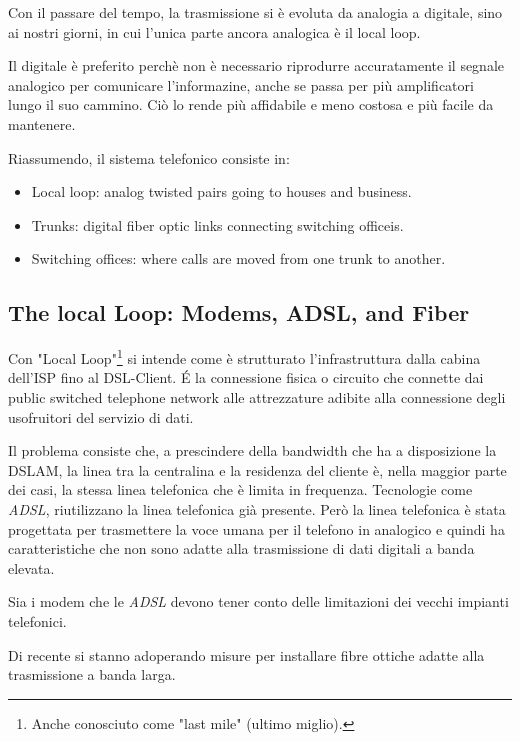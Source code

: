 \documentclass[../ComputerNetworks.tex]{subfiles}
\begin{document}
Con il passare del tempo, la trasmissione si è evoluta da analogia a digitale, sino ai nostri giorni, in cui l'unica parte ancora analogica è il local loop.

Il digitale è preferito perchè non è necessario riprodurre accuratamente il segnale analogico per comunicare l'informazine, anche se passa per più amplificatori lungo il suo cammino.
Ciò lo rende più affidabile e meno costosa e più facile da mantenere.

Riassumendo, il sistema telefonico consiste in:
\begin{itemize}
    \item Local loop: analog twisted pairs going to houses and business.
    \item Trunks: digital fiber optic links connecting switching officeis.
    \item Switching offices: where calls are moved from one trunk to another.
\end{itemize}


\subsection{The local Loop: Modems, ADSL, and Fiber}

Con "Local Loop"\footnote{Anche conosciuto come "last mile" (ultimo miglio).} si intende come è strutturato l'infrastruttura dalla cabina dell'ISP fino al DSL-Client.
\'E la connessione fisica o circuito che connette dai public switched telephone network alle attrezzature adibite alla connessione degli usofruitori del servizio di dati.

Il problema consiste che, a prescindere della bandwidth che ha a disposizione la DSLAM, la linea tra la centralina e la residenza del cliente è, nella maggior parte dei casi, la stessa linea telefonica che è limita in frequenza.
Tecnologie come \emph{ADSL}, riutilizzano la linea telefonica già presente.
Però la linea telefonica è stata progettata per trasmettere la voce umana per il telefono in analogico e quindi ha caratteristiche che non sono adatte alla trasmissione di dati digitali a banda elevata.

Sia i modem che le \emph{ADSL} devono tener conto delle limitazioni dei vecchi impianti telefonici.

Di recente si stanno adoperando misure per installare fibre ottiche adatte alla trasmissione a banda larga.
\end{document}
